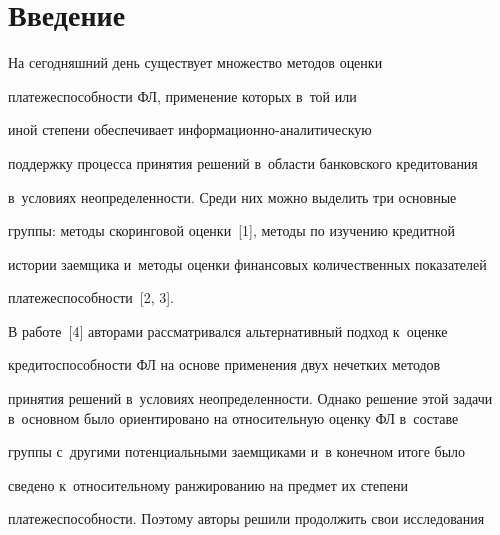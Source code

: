 












      \thispagestyle{headings}

      




\section{Введение}



  На сегодняшний день существует множество методов оценки 

платежеспособности ФЛ, применение которых в~той или 

иной степени обеспечивает ин\-фор\-ма\-ци\-он\-но-ана\-ли\-ти\-че\-скую 

поддержку процесса принятия решений в~области банковского кредитования 

в~условиях неопределенности. Среди них можно выделить три основные 

группы: методы скоринговой оценки~[1], методы по изучению кредитной 

истории заемщика и~методы оценки финансовых количественных показателей 

платежеспособности~[2, 3]. 

  

  В работе~[4] авторами рассматривался альтернативный подход к~оценке 

кредитоспособности ФЛ на основе применения двух нечетких методов 

принятия решений в~условиях неопределенности. Однако решение этой задачи в~основном было ориентировано на относительную оценку ФЛ в~составе 

группы с~другими потенциальными заемщиками и~в конечном итоге было 

сведено к~относительному ранжированию на предмет их степени 

платежеспособности. Поэтому авторы решили продолжить свои исследования 

